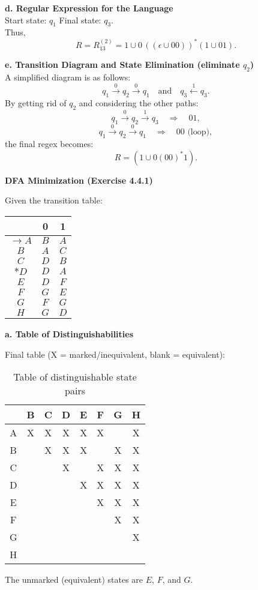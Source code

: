 \documentclass{article}
\theoremstyle{theorem}
\theoremstyle{definition}
\theoremstyle{remark}
\begin{document}
\medskip

\textbf{d. Regular Expression for the Language}\\[1mm]
Start state: \(q_1\) \quad Final state: \(q_3\).\\[1mm]
Thus,
\[
R = R_{13}^{(2)} = 1 \cup 0\,( (\epsilon \cup 00) )^*(1 \cup 01).
\]

\medskip

\textbf{e. Transition Diagram and State Elimination (eliminate \(q_2\))}\\[1mm]
A simplified diagram is as follows:
\[
q_1 \xrightarrow{0} q_2 \xrightarrow{0} q_1 \quad \text{and} \quad q_3 \xleftarrow{1} q_3.
\]
By getting rid of \(q_2\) and considering the other paths:
\[
q_1 \xrightarrow{0} q_2 \xrightarrow{1} q_3 \quad \Rightarrow \quad 01,
\]
\[
q_1 \xrightarrow{0} q_2 \xrightarrow{0} q_1 \quad \Rightarrow \quad 00 \text{ (loop)},
\]
the final regex becomes:
\[
R = \left( 1 \cup 0(00)^*1 \right).
\]

\bigskip

\textbf{DFA Minimization (Exercise 4.4.1)}

Given the transition table:
\begin{center}
\begin{tabular}{|c|c|c|}
\hline
       & 0   & 1   \\ \hline
$\rightarrow A$ & $B$ & $A$ \\ \hline
$B$ & $A$ & $C$ \\ \hline
$C$ & $D$ & $B$ \\ \hline
$*D$ & $D$ & $A$ \\ \hline
$E$ & $D$ & $F$ \\ \hline
$F$ & $G$ & $E$ \\ \hline
$G$ & $F$ & $G$ \\ \hline
$H$ & $G$ & $D$ \\ \hline
\end{tabular}
\end{center}

\medskip

\textbf{a. Table of Distinguishabilities}

Final table (X = marked/inequivalent, blank = equivalent):
\begin{table}[h]
  \centering
  \begin{tabular}{c|ccccccc}
     & B & C & D & E & F & G & H \\ \hline
  A  & X & X & X & X & X &   & X \\
  B  &   & X & X & X &   & X & X \\
  C  &   &   & X &   & X & X & X \\
  D  &   &   &   & X & X & X & X \\
  E  &   &   &   &   & X & X & X \\
  F  &   &   &   &   &   & X & X \\
  G  &   &   &   &   &   &   & X \\
  H  &   &   &   &   &   &   &   \\
  \end{tabular}
  \caption{Table of distinguishable state pairs}
  \label{tab:distinguishables}
  \end{table}
The unmarked (equivalent) states are \(E\), \(F\), and \(G\).
\end{document}
